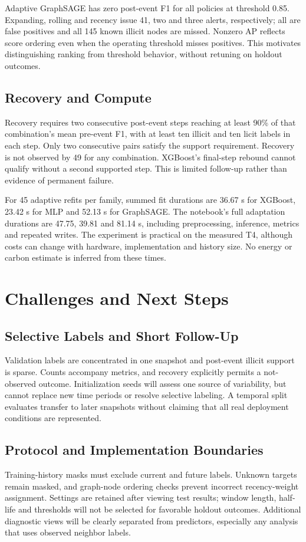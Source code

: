\documentclass[conference]{IEEEtran}
\begin{document}
Adaptive GraphSAGE has zero post-event F1 for all policies at threshold 0.85. Expanding, rolling and recency issue 41, two and three alerts, respectively; all are false positives and all 145 known illicit nodes are missed. Nonzero AP reflects score ordering even when the operating threshold misses positives. This motivates distinguishing ranking from threshold behavior, without retuning on holdout outcomes.

\subsection{Recovery and Compute}
Recovery requires two consecutive post-event steps reaching at least 90\% of that combination's mean pre-event F1, with at least ten illicit and ten licit labels in each step. Only two consecutive pairs satisfy the support requirement. Recovery is not observed by 49 for any combination. XGBoost's final-step rebound cannot qualify without a second supported step. This is limited follow-up rather than evidence of permanent failure.

For 45 adaptive refits per family, summed fit durations are 36.67 s for XGBoost, 23.42 s for MLP and 52.13 s for GraphSAGE. The notebook's full adaptation durations are 47.75, 39.81 and 81.14 s, including preprocessing, inference, metrics and repeated writes. The experiment is practical on the measured T4, although costs can change with hardware, implementation and history size. No energy or carbon estimate is inferred from these times.

\section{Challenges and Next Steps}
\subsection{Selective Labels and Short Follow-Up}
Validation labels are concentrated in one snapshot and post-event illicit support is sparse. Counts accompany metrics, and recovery explicitly permits a not-observed outcome. Initialization seeds will assess one source of variability, but cannot replace new time periods or resolve selective labeling. A temporal split evaluates transfer to later snapshots without claiming that all real deployment conditions are represented.

\subsection{Protocol and Implementation Boundaries}
Training-history masks must exclude current and future labels. Unknown targets remain masked, and graph-node ordering checks prevent incorrect recency-weight assignment. Settings are retained after viewing test results; window length, half-life and thresholds will not be selected for favorable holdout outcomes. Additional diagnostic views will be clearly separated from predictors, especially any analysis that uses observed neighbor labels.
\end{document}
